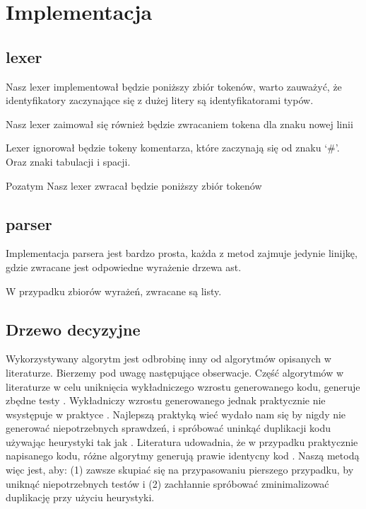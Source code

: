\documentclass{article}
\begin{document}
\section{Implementacja}
\subsection{lexer}
Nasz lexer implementował będzie poniższy zbiór tokenów, warto zauważyć, że identyfikatory zaczynające się z dużej litery są identyfikatorami typów.

Nasz lexer zaimował się również będzie zwracaniem tokena dla znaku nowej linii

Lexer ignorował będzie tokeny komentarza, które zaczynają się od znaku `\#'. Oraz znaki tabulacji i spacji.
\newpage


Pozatym Nasz lexer zwracał będzie poniższy zbiór tokenów


\subsection{parser}
Implementacja parsera jest bardzo prosta, każda z metod zajmuje jedynie linijkę, gdzie zwracane jest odpowiedne wyrażenie drzewa ast.

W przypadku zbiorów wyrażeń, zwracane są listy.\newpage


\subsection{Drzewo decyzyjne}
Wykorzystywany algorytm jest odbrobinę inny od algorytmów opisanych w literaturze. Bierzemy pod uwagę następujące obserwacje. Część algorytmów w literaturze w celu uniknięcia wykładniczego wzrostu generowanego kodu, generuje zbędne testy \cite{Augustsson__1985}. Wykładniczy wzrostu generowanego jednak praktycznie nie wsystępuje w praktyce \cite{Scott__Ramsey__2000}. Najlepszą praktyką wieć wydało nam się by nigdy nie generować niepotrzebnych sprawdzeń, i spróbować uninkąć duplikacji kodu używając heurystyki tak jak \cite{Maranget__2008}. Literatura udowadnia, że w przypadku praktycznie napisanego kodu, różne algorytmy generują prawie identycny kod  \cite{Scott__Ramsey__2000, Maranget__2008}. Naszą metodą więc jest, aby: (1) zawsze skupiać się na przypasowaniu pierszego przypadku, by uniknąć niepotrzebnych testów i (2) zachłannie spróbować zminimalizować duplikację przy użyciu heurystyki.
\end{document}

